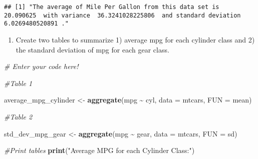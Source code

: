 \documentclass[
]{article}
\newenvironment{Shaded}{\begin{snugshade}}{\end{snugshade}}
\newcommand{\AttributeTok}[1]{\textcolor[rgb]{0.13,0.29,0.53}{#1}}
\newcommand{\CommentTok}[1]{\textcolor[rgb]{0.56,0.35,0.01}{\textit{#1}}}
\newcommand{\ConstantTok}[1]{\textcolor[rgb]{0.56,0.35,0.01}{#1}}
\newcommand{\FunctionTok}[1]{\textcolor[rgb]{0.13,0.29,0.53}{\textbf{#1}}}
\newcommand{\NormalTok}[1]{#1}
\newcommand{\OtherTok}[1]{\textcolor[rgb]{0.56,0.35,0.01}{#1}}
\newcommand{\SpecialCharTok}[1]{\textcolor[rgb]{0.81,0.36,0.00}{\textbf{#1}}}
\newcommand{\StringTok}[1]{\textcolor[rgb]{0.31,0.60,0.02}{#1}}
\providecommand{\tightlist}{%
  \setlength{\itemsep}{0pt}\setlength{\parskip}{0pt}}
\begin{document}
\begin{Shaded}
\end{Shaded}

\begin{verbatim}
## [1] "The average of Mile Per Gallon from this data set is  20.090625  with variance  36.3241028225806  and standard deviation 6.0269480520891 ."
\end{verbatim}

\begin{enumerate}
\def\labelenumi{\alph{enumi}.}
\setcounter{enumi}{3}
\tightlist
\item
  Create two tables to summarize 1) average mpg for each cylinder class
  and 2) the standard deviation of mpg for each gear class.
\end{enumerate}

\begin{Shaded}
\begin{Highlighting}[]
\CommentTok{\# Enter your code here!}

\CommentTok{\#Table 1}

\NormalTok{average\_mpg\_cylinder }\OtherTok{\textless{}{-}} \FunctionTok{aggregate}\NormalTok{(mpg }\SpecialCharTok{\textasciitilde{}}\NormalTok{ cyl, }\AttributeTok{data =}\NormalTok{ mtcars, }\AttributeTok{FUN =}\NormalTok{ mean)}


\CommentTok{\#Table 2}

\NormalTok{std\_dev\_mpg\_gear }\OtherTok{\textless{}{-}} \FunctionTok{aggregate}\NormalTok{(mpg }\SpecialCharTok{\textasciitilde{}}\NormalTok{ gear, }\AttributeTok{data =}\NormalTok{ mtcars, }\AttributeTok{FUN =}\NormalTok{ sd)}

\CommentTok{\#Print tables}
\FunctionTok{print}\NormalTok{(}\StringTok{"Average MPG for each Cylinder Class:"}\NormalTok{)}
\end{Highlighting}
\end{Shaded}
\end{document}
